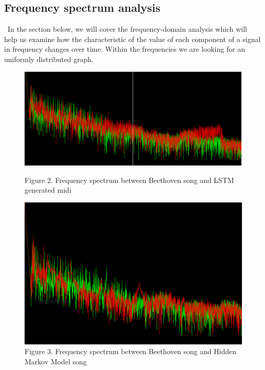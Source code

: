 \documentclass[12pt]{article}
\begin{document}
\subsection*{Frequency spectrum analysis}
\begin{flushright}
  \begin{minipage}[t]{0.96\linewidth}\
    In the section below, we will cover the frequency-domain analysis which will help us examine how the characteristic of the value of each component of a signal in frequency changes over time. Within the frequencies we are looking for an uniformly distributed graph. \\
  \end{minipage}
  \begin{figure}
    \centering
    \includegraphics[scale=0.3]{../images/diff_LSTM_Beeth}
    \caption{Figure 2. Frequency spectrum between Beethoven song and LSTM generated midi}
    \label{Figure 2}
    \vspace{1cm}
    \includegraphics[scale=0.3]{../images/diff_HMM_Beeth}
    \caption{Figure 3. Frequency spectrum between Beethoven song and Hidden Markov Model song}
    \label{Figure 3}
  \end{figure}
\end{flushright}
\end{document}
